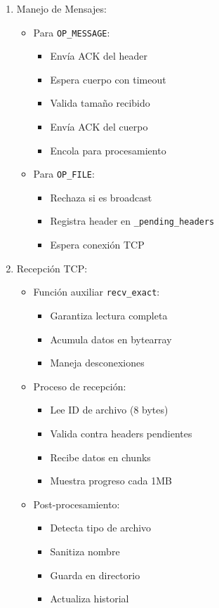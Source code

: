 \documentclass[12pt]{article}
\begin{document}
\begin{enumerate}
    \item Manejo de Mensajes:
    \begin{itemize}
        \item Para \texttt{OP\_MESSAGE}:
        \begin{itemize}
            \item Envía ACK del header
            \item Espera cuerpo con timeout
            \item Valida tamaño recibido
            \item Envía ACK del cuerpo
            \item Encola para procesamiento
        \end{itemize}
        \item Para \texttt{OP\_FILE}:
        \begin{itemize}
            \item Rechaza si es broadcast
            \item Registra header en \texttt{\_pending\_headers}
            \item Espera conexión TCP
        \end{itemize}
    \end{itemize}

    \item Recepción TCP:
    \begin{itemize}
        \item Función auxiliar \texttt{recv\_exact}:
        \begin{itemize}
            \item Garantiza lectura completa
            \item Acumula datos en bytearray
            \item Maneja desconexiones
        \end{itemize}
        \item Proceso de recepción:
        \begin{itemize}
            \item Lee ID de archivo (8 bytes)
            \item Valida contra headers pendientes
            \item Recibe datos en chunks
            \item Muestra progreso cada 1MB
        \end{itemize}
        \item Post-procesamiento:
        \begin{itemize}
            \item Detecta tipo de archivo
            \item Sanitiza nombre
            \item Guarda en directorio
            \item Actualiza historial
        \end{itemize}
    \end{itemize}
\end{enumerate}
\end{document}
